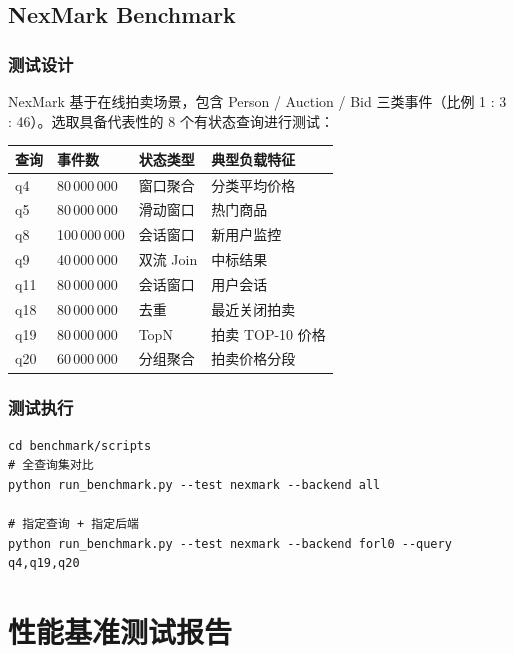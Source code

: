 \documentclass[a4paper,11pt]{article}
\begin{document}
\subsection{NexMark Benchmark}

\subsubsection{测试设计}

NexMark 基于在线拍卖场景，包含 Person / Auction / Bid 三类事件（比例 1 : 3 : 46）。选取具备代表性的 8 个有状态查询进行测试：

\begin{table}[H]
\centering
\small
\begin{tabularx}{\textwidth}{L{1.2cm} L{3.6cm} L{3.8cm} X}
\toprule
\textbf{查询} & \textbf{事件数} & \textbf{状态类型} & \textbf{典型负载特征} \\
\midrule
q4  & 80\,000\,000  & 窗口聚合            & 分类平均价格 \\
q5  & 80\,000\,000  & 滑动窗口            & 热门商品 \\
q8  & 100\,000\,000 & 会话窗口            & 新用户监控 \\
q9  & 40\,000\,000  & 双流 Join          & 中标结果 \\
q11 & 80\,000\,000  & 会话窗口            & 用户会话 \\
q18 & 80\,000\,000  & 去重                & 最近关闭拍卖 \\
q19 & 80\,000\,000  & TopN                & 拍卖 TOP-10 价格 \\
q20 & 60\,000\,000  & 分组聚合            & 拍卖价格分段 \\
\bottomrule
\end{tabularx}
\end{table}

\subsubsection{测试执行}

\begin{lstlisting}[language=shellcmd]
cd benchmark/scripts
# 全查询集对比
python run_benchmark.py --test nexmark --backend all

# 指定查询 + 指定后端
python run_benchmark.py --test nexmark --backend forl0 --query q4,q19,q20
\end{lstlisting}

\section{性能基准测试报告}
\end{document}
